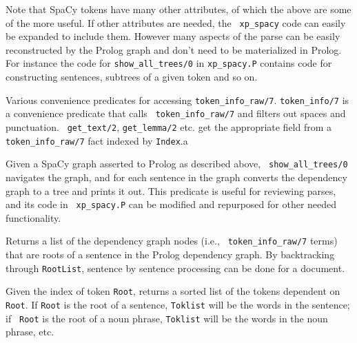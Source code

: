 \begin{description}
Note that SpaCy tokens have many other attributes, of which the above
are some of the more useful.  If other attributes are needed, the {\tt
  xp\_spacy} code can easily be expanded to include them.  However
many aspects of the parse can be easily reconstructed by the Prolog
graph and don't need to be materialized in Prolog.  For instance the
code for {\tt show\_all\_trees/0} in {\tt xp\_spacy.P} contains code
for constructing sentences, subtrees of a given token and so on.

%
Various convenience predicates for accessing {\tt token\_info\_raw/7}.
{\tt token\_info/7} is a convenience predicate that calls {\tt
  token\_info\_raw/7} and filters out spaces and punctuation.  {\tt
  get\_text/2}, {\tt get\_lemma/2} etc. get the appropriate field from
a {\tt token\_info\_raw/7} fact indexed by {\tt Index}.a
  
%
  Given a SpaCy graph asserted to Prolog as described above, {\tt
    show\_all\_trees/0} navigates the graph, and for each sentence in
  the graph converts the dependency graph to a tree and prints it out.
  This predicate is useful for reviewing parses, and its code in {\tt
    xp\_spacy.P} can be modified and repurposed for other needed
  functionality.

%
Returns a list of the dependency graph nodes (i.e., {\tt
  token\_info\_raw/7} terms) that are roots of a sentence in the
Prolog dependency graph.  By backtracking through {\tt RootList},
sentence by sentence processing can be done for a document.

%
Given the index of token {\tt Root}, returns a sorted list of the
tokens dependent on {\tt Root}.  If {\tt Root} is the root of a
sentence, {\tt Toklist} will be the words in the sentence; if {\tt
  Root} is the root of a noun phrase, {\tt Toklist} will be the words
in the noun phrase, etc.

\end{description}  

